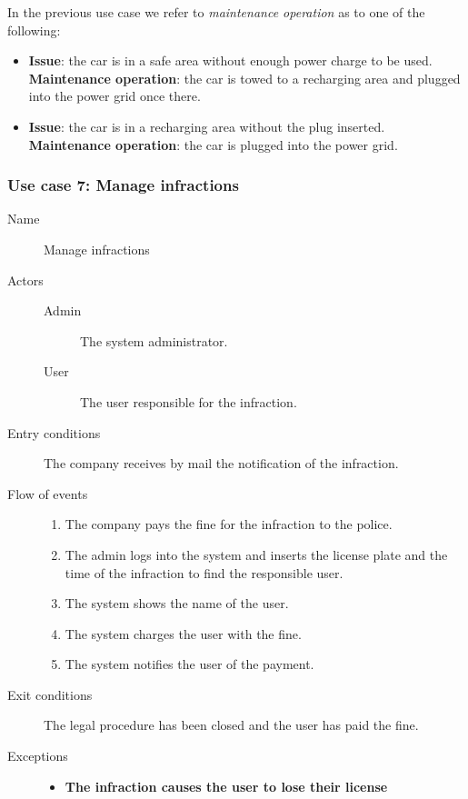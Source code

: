 		In the previous use case we refer to \textit{maintenance operation} as to one of the following:
	\begin{itemize}
		\item \textbf{Issue}: the car is in a safe area without enough power charge to be used. \textbf{Maintenance operation}: the car is towed to a recharging area and plugged into the power grid once there.
		\item \textbf{Issue}: the car is in a recharging area without the plug inserted. \textbf{Maintenance operation}: the car is plugged into the power grid.
	\end{itemize}
	
	
	\subsubsection{Use case 7: Manage infractions}
	\begin{description}
		\item[Name] Manage infractions
		\item[Actors] \hfill
			\begin{description}
				\item[Admin] The system administrator.
				\item[User] The user responsible for the infraction.
			\end{description}
		\item[Entry conditions] The company receives by mail the notification of the infraction.
		\item[Flow of events] \hfill
			\begin{enumerate}
				\item The company pays the fine for the infraction to the police. 
				\item The admin logs into the system and inserts the license plate and the time of the infraction to find the responsible user.
				\item The system shows the name of the user.
				\item The system charges the user with the fine.
				\item The system notifies the user of the payment. 
			\end{enumerate}
		\item[Exit conditions] The legal procedure has been closed and the user has paid the fine.
		\item[Exceptions] \hfill
			\begin{itemize} %
				\item \textbf{The infraction causes the user to lose their license} %
			\end{itemize}
	\end{description}